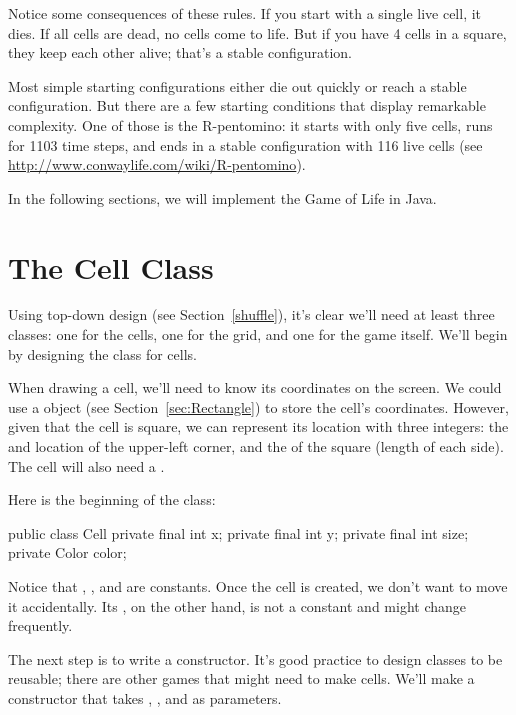 Notice some consequences of these rules.
If you start with a single live cell, it dies.
If all cells are dead, no cells come to life.
But if you have 4 cells in a square, they keep each other alive; that's a stable configuration.

Most simple starting configurations either die out quickly or reach a stable configuration.
But there are a few starting conditions that display remarkable complexity.
One of those is the R-pentomino: it starts with only five cells, runs for 1103 time steps, and ends in a stable configuration with 116 live cells (see
\url{http://www.conwaylife.com/wiki/R-pentomino}).

In the following sections, we will implement the Game of Life in Java.


\section{The Cell Class}

Using top-down design (see Section~\ref{shuffle}), it's clear we'll need at least three classes: one for the cells, one for the grid, and one for the game itself.
We'll begin by designing the class for cells.

When drawing a cell, we'll need to know its coordinates on the screen.
We could use a  object (see Section~\ref{sec:Rectangle}) to store the cell's coordinates.
However, given that the cell is square, we can represent its location with three integers: the  and  location of the upper-left corner, and the  of the square (length of each side).
The cell will also need a .

Here is the beginning of the  class:

\begin{code}
public class Cell {
    private final int x;
    private final int y;
    private final int size;
    private Color color;
}
\end{code}

Notice that , , and  are constants.
Once the cell is created, we don't want to move it accidentally.
Its , on the other hand, is not a constant and might change frequently.

The next step is to write a constructor.
It's good practice to design classes to be reusable; there are other games that might need to make cells.
We'll make a constructor that takes , , and  as parameters.


